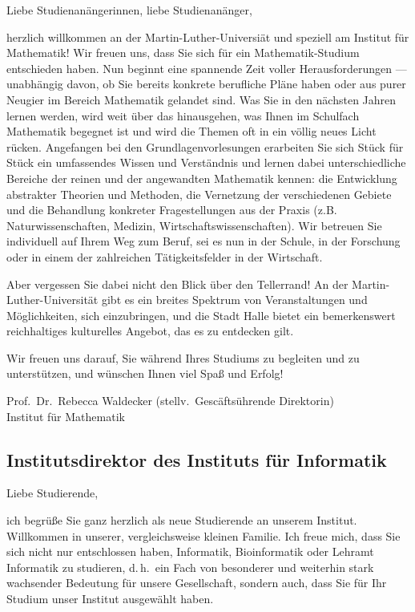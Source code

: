 Liebe Studienanängerinnen, liebe Studienanänger,

herzlich willkommen an der Martin-Luther-Universiät und speziell am Institut für
Mathematik!  Wir freuen uns, dass Sie sich für ein Mathematik-Studium
entschieden haben.  Nun beginnt eine spannende Zeit voller Herausforderungen ---
unabhängig davon, ob Sie bereits konkrete berufliche Pläne haben oder aus purer
Neugier im Bereich Mathematik gelandet sind.  Was Sie in den nächsten Jahren
lernen werden, wird weit über das hinausgehen, was Ihnen im Schulfach Mathematik
begegnet ist und wird die Themen oft in ein völlig neues Licht rücken.
Angefangen bei den Grundlagenvorlesungen erarbeiten Sie sich Stück für Stück ein
umfassendes Wissen und Verständnis und lernen dabei unterschiedliche Bereiche
der reinen und der angewandten Mathematik kennen: die Entwicklung abstrakter
Theorien und Methoden, die Vernetzung der verschiedenen Gebiete und die
Behandlung konkreter Fragestellungen aus der Praxis (z.B. Naturwissenschaften,
Medizin, Wirtschaftswissenschaften).  Wir betreuen Sie individuell auf Ihrem Weg
zum Beruf, sei es nun in der Schule, in der Forschung oder in einem der
zahlreichen Tätigkeitsfelder in der Wirtschaft.

Aber vergessen Sie dabei nicht den Blick über den Tellerrand! An der
Martin-Luther-Universität gibt es ein breites Spektrum von Veranstaltungen und
Möglichkeiten, sich einzubringen, und die Stadt Halle bietet ein bemerkenswert
reichhaltiges kulturelles Angebot, das es zu entdecken gilt.

Wir freuen uns darauf, Sie während Ihres Studiums zu begleiten und zu
unterstützen, und wünschen Ihnen viel Spaß und Erfolg!

Prof.\ Dr.\ Rebecca Waldecker (stellv.\ Gescäftsührende Direktorin)\\
Institut für Mathematik


\subsection{Institutsdirektor des Instituts für Informatik}

Liebe Studierende,

ich begrüße Sie ganz herzlich als neue Studierende an unserem Institut.
Willkommen in unserer, vergleichsweise kleinen Familie. Ich freue mich, dass Sie
sich nicht nur entschlossen haben, Informatik, Bioinformatik oder Lehramt
Informatik zu studieren, d.\,h.\ ein Fach von  besonderer und weiterhin stark
wachsender Bedeutung für unsere Gesellschaft, sondern auch, dass Sie für Ihr
Studium unser Institut ausgewählt haben.

